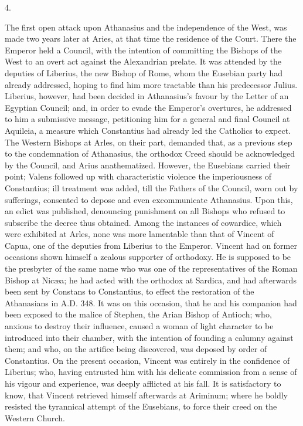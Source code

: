 4.

The first open attack upon Athanasius and the independence of the
West, was made two years later at Aries, at that time the residence of
the Court. There the Emperor held a Council, with the intention of
committing the Bishops of the West to an overt act against the
Alexandrian prelate. It was attended by the deputies of Liberius, the
new Bishop of Rome, whom the Eusebian party had already addressed,
hoping to find him more tractable than his predecessor Julius.
Liberius, however, had been decided in Athanasius's favour by the
Letter of an Egyptian Council; and, in order to evade the Emperor's
overtures, he addressed to him a submissive message, petitioning him
for a general and final Council at Aquileia, a measure which
Constantius had already led the Catholics to expect. The Western
Bishops at Arles, on their part, demanded that, as a previous
step to the condemnation of Athanasius, the orthodox Creed should be
acknowledged by the Council, and Arius anathematized. However, the
Eusebians carried their point; Valens followed up with characteristic
violence the imperiousness of Constantius; ill treatment was added,
till the Fathers of the Council, worn out by sufferings, consented to
depose and even excommunicate Athanasius. Upon this, an edict was
published, denouncing punishment on all Bishops who refused to
subscribe the decree thus obtained. Among the instances of cowardice,
which were exhibited at Arles, none was more lamentable than that of
Vincent of Capua, one of the deputies from Liberius to the Emperor.
Vincent had on former occasions shown himself a zealous supporter of
orthodoxy. He is supposed to be the presbyter of the same name who was
one of the representatives of the Roman Bishop at Nicæa; he had acted
with the orthodox at Sardica, and had afterwards been sent by Constans
to Constantius, to effect the restoration of the Athanasians in A.D.
348. It was on this occasion, that he and his companion had been
exposed to the malice of Stephen, the Arian Bishop of Antioch; who,
anxious to destroy their influence, caused a woman of light character
to be introduced into their chamber, with the intention of founding a
calumny against them; and who, on the artifice being discovered, was
deposed by order of Constantius. On the present occasion, Vincent was
entirely in the confidence of Liberius; who, having entrusted him with
his delicate commission from a sense of his vigour and experience, was
deeply afflicted at his fall. It is satisfactory to know, that
Vincent retrieved himself afterwards at Ariminum; where he boldly
resisted the tyrannical attempt of the Eusebians, to force their creed
on the Western Church.

